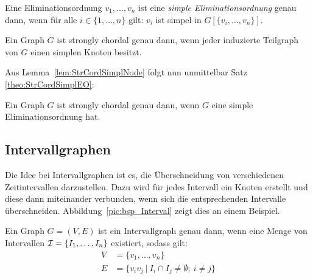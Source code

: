 \begin{mydef}\label{def:simpleEO}
    Eine Eliminationsordnung $v_1,\ldots,v_n$ ist eine \emph{simple Eliminationsordnung} genau dann, wenn für alle $i \in \{1, \ldots, n\}$ gilt: $v_i$ ist simpel in $G[\{v_i,\ldots,v_n\}]$.
\end{mydef}

\begin{Lemma}\label{lem:StrCordSimplNode}
    \cite{Faber1983} Ein Graph $G$ ist strongly chordal genau dann, wenn jeder induzierte Teilgraph von $G$ einen simplen Knoten besitzt.
\end{Lemma}

Aus Lemma~\ref{lem:StrCordSimplNode} folgt nun unmittelbar Satz \ref{theo:StrCordSimplEO}:

\begin{Theorem}\label{theo:StrCordSimplEO}
    Ein Graph $G$ ist strongly chordal genau dann, wenn $G$ eine simple Eliminationsordnung hat.
\end{Theorem}

\subsection{Intervallgraphen}

 Die Idee bei Intervallgraphen ist es, die Überschneidung von verschiedenen Zeitintervallen darzustellen. Dazu wird für jedes Intervall ein Knoten erstellt und diese dann miteinander verbunden, wenn sich die entsprechenden Intervalle überschneiden. Abbildung~\ref{pic:bsp_Interval} zeigt dies an einem Beispiel.

\begin{mydef}
    Ein Graph $G=(V,E)$ ist ein Intervallgraph genau dann, wenn eine Menge von Intervallen $\mathcal{I} =\{I_1,\ldots,I_n\}$ existiert, sodass gilt:
    \begin{align*}
        V &= \{v_1, \ldots, v_n\} \\
        E &= \{v_iv_j \ |\ I_i \cap I_j \neq \emptyset ;\ i \neq j \}
    \end{align*}
\end{mydef}

